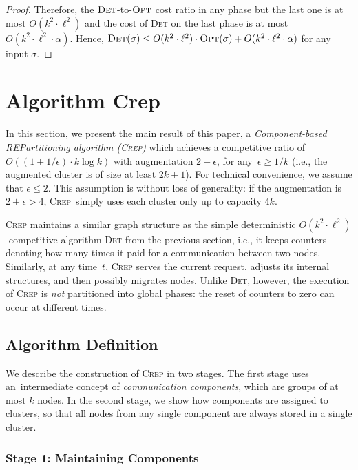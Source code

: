 \documentclass{siamart190516}
\newcommand{\OPT}{\textsc{Opt}\xspace}
\newcommand{\CREP}{\textsc{Crep}\xspace}
\newcommand{\DET}{\textsc{Det}\xspace}
\newcommand{\eps}{\ensuremath{\epsilon}}
\begin{document}
\begin{proof}
Therefore, the $\DET$-to-$\OPT$ cost ratio in any phase but the last one is at
most $O(k^2 \cdot \ell^2)$ and the cost of \DET on the last phase is at
most $O(k^2 \cdot \ell^2 \cdot \alpha)$. Hence,
$\DET(\sigma) \leq O(k^2 \cdot \ell^2) \cdot \OPT(\sigma) + O(k^2 \cdot
\ell^2 \cdot \alpha)$ for any input $\sigma$.
\end{proof}




\section{Algorithm {\sc Crep}}
\label{sec:crep}

In this section, we present the main result of this paper, a
\emph{Component-based REPartitioning algorithm (\CREP)} which achieves a
competitive ratio of $O((1 + 1/\eps) \cdot k \log k)$ with augmentation
$2+\eps$, for any~$\eps \geq 1/k$ (i.e., the augmented cluster
is of size at least $2k+1$). For technical convenience, we assume that 
$\eps \leq 2$. This assumption is without loss of generality: if the augmentation 
is $2+\eps > 4$, \CREP~simply uses each cluster only up to capacity $4k$.

\CREP maintains a similar graph structure as the
simple deterministic $O(k^2 \cdot \ell^2)$-competitive algorithm \DET from the
previous section, i.e., it keeps counters denoting how many times it paid for a
communication between two nodes. Similarly, at any time~$t$,
\CREP serves the current request, adjusts its internal structures, and then
possibly migrates nodes. Unlike \DET, however, the execution of \CREP is
\emph{not} partitioned into global phases: the reset of counters to zero can
occur at different times.


\subsection{Algorithm Definition}

We describe the construction of \CREP in two stages. The first stage uses
an~intermediate concept of \emph{communication components}, which are groups of at
most $k$ nodes. In the second stage, we show how components are assigned to
clusters, so that all nodes from any single component are always stored in a
single cluster.


\subsubsection{Stage 1: Maintaining Components}
\end{document}
